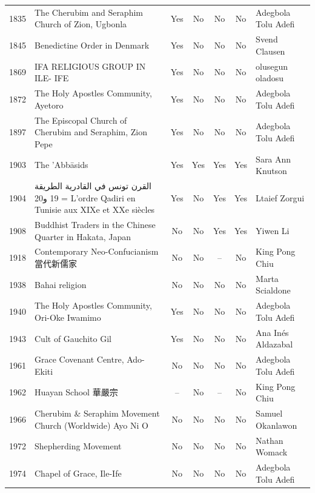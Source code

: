 {\begin{longtable}{rp{3.5cm}ccccp{3cm}}
1835 & {\raggedright The Cherubim and Seraphim Church of Zion, Ugbonla} & Yes & No & No & No & {\raggedright Adegbola Tolu Adefi} \\
1845 & {\raggedright Benedictine Order in Denmark} & Yes & No & No & No & {\raggedright Svend Clausen} \\
1869 & {\raggedright IFA RELIGIOUS GROUP IN ILE- IFE} & Yes & No & No & No & {\raggedright olusegun oladosu} \\
1872 & {\raggedright The Holy Apostles Community, Ayetoro} & Yes & No & No & No & {\raggedright Adegbola Tolu Adefi} \\
1897 & {\raggedright The Episcopal Church of Cherubim and Seraphim, Zion Pepe} & Yes & No & No & No & {\raggedright Adegbola Tolu Adefi} \\
1903 & {\raggedright The 'Abbāsids} & Yes & Yes & Yes & Yes & {\raggedright Sara Ann Knutson} \\
1904 & {\raggedright {\arabicfont القرن تونس في القادرية الطريقة}  19 {\arabicfont و}20   =  L'ordre Qadiri en Tunisie aux XIXe et XXe siècles} & Yes & No & Yes & Yes & {\raggedright Ltaief Zorgui} \\
1908 & {\raggedright Buddhist Traders in the Chinese Quarter in Hakata, Japan} & No & No & Yes & Yes & {\raggedright Yiwen Li} \\
1918 & {\raggedright Contemporary Neo-Confucianism 當代新儒家} & No & No & -- & No & {\raggedright King Pong Chiu} \\
1938 & {\raggedright Bahai religion} & No & No & No & No & {\raggedright Marta Scialdone} \\
1940 & {\raggedright The Holy Apostles Community, Ori-Oke Iwamimo} & Yes & No & No & No & {\raggedright Adegbola Tolu Adefi} \\
1943 & {\raggedright Cult of Gauchito Gil} & Yes & No & No & No & {\raggedright Ana Inés Aldazabal} \\
1961 & {\raggedright Grace Covenant Centre, Ado-Ekiti} & No & No & No & No & {\raggedright Adegbola Tolu Adefi} \\
1962 & {\raggedright Huayan School 華嚴宗} & -- & No & -- & No & {\raggedright King Pong Chiu} \\
1966 & {\raggedright Cherubim \& Seraphim Movement Church (Worldwide) Ayo Ni O} & No & No & No & No & {\raggedright Samuel Okanlawon} \\
1972 & {\raggedright Shepherding Movement} & No & No & No & No & {\raggedright Nathan Womack} \\
1974 & {\raggedright Chapel of Grace, Ile-Ife} & No & No & No & No & {\raggedright Adegbola Tolu Adefi} \\

\end{longtable}}

